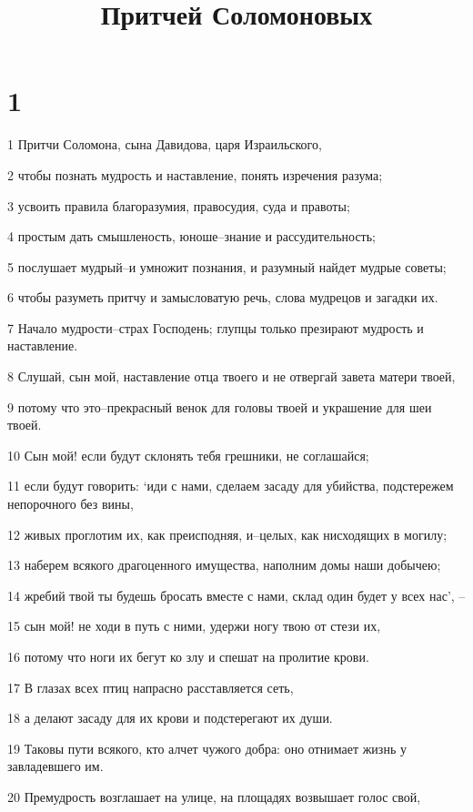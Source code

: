 

\title{Притчей Соломоновых}


\chapter{1}

\par 1 Притчи Соломона, сына Давидова, царя Израильского,
\par 2 чтобы познать мудрость и наставление, понять изречения разума;
\par 3 усвоить правила благоразумия, правосудия, суда и правоты;
\par 4 простым дать смышленость, юноше--знание и рассудительность;
\par 5 послушает мудрый--и умножит познания, и разумный найдет мудрые советы;
\par 6 чтобы разуметь притчу и замысловатую речь, слова мудрецов и загадки их.
\par 7 Начало мудрости--страх Господень; глупцы только презирают мудрость и наставление.
\par 8 Слушай, сын мой, наставление отца твоего и не отвергай завета матери твоей,
\par 9 потому что это--прекрасный венок для головы твоей и украшение для шеи твоей.
\par 10 Сын мой! если будут склонять тебя грешники, не соглашайся;
\par 11 если будут говорить: `иди с нами, сделаем засаду для убийства, подстережем непорочного без вины,
\par 12 живых проглотим их, как преисподняя, и--целых, как нисходящих в могилу;
\par 13 наберем всякого драгоценного имущества, наполним домы наши добычею;
\par 14 жребий твой ты будешь бросать вместе с нами, склад один будет у всех нас', --
\par 15 сын мой! не ходи в путь с ними, удержи ногу твою от стези их,
\par 16 потому что ноги их бегут ко злу и спешат на пролитие крови.
\par 17 В глазах всех птиц напрасно расставляется сеть,
\par 18 а делают засаду для их крови и подстерегают их души.
\par 19 Таковы пути всякого, кто алчет чужого добра: оно отнимает жизнь у завладевшего им.
\par 20 Премудрость возглашает на улице, на площадях возвышает голос свой,
